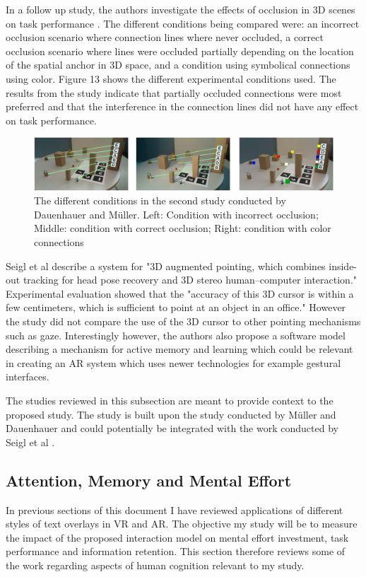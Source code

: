 \documentclass{article}
\begin{document}
In a follow up study, the authors investigate the effects of occlusion in 3D scenes on task performance \cite{Mller7836504}. The different conditions being compared were: an incorrect occlusion scenario where connection lines where never occluded, a correct occlusion scenario where lines were occluded partially depending on the location of the spatial anchor in 3D space, and a condition using symbolical connections using color. Figure 13 shows the different experimental conditions used. The results from the study indicate that partially occluded connections were most preferred and that the interference in the connection lines did not have any effect on task performance.  

\begin{figure}[htbp]
		
        \includegraphics[width=\textwidth]{Images/occludedLink.jpg}
    	\caption{The different conditions in the second study conducted by Dauenhauer and Müller. Left: Condition with incorrect occlusion; Middle: condition with correct occlusion; Right: condition
with color connections \cite{Mller7836504}
}
\end{figure}

Seigl et al \cite{Siegl20071895} describe a system for "3D augmented pointing, which combines inside-out tracking for head pose recovery and 3D stereo human–computer interaction."  Experimental evaluation showed that the "accuracy of this 3D cursor is within a few centimeters, which is sufficient to point at an object in an office." However the study did not compare the use of the 3D cursor to other pointing mechanisms such as gaze.  Interestingly however, the authors also propose a software model describing a mechanism for active memory and learning which could be relevant in creating an AR system which uses newer technologies for example gestural interfaces. 

The studies reviewed in this subsection are meant to provide context to the proposed study. The study is built upon the study conducted by Müller and Dauenhauer \cite{Mller2016} and could potentially be integrated with the work conducted by Seigl et al \cite{Siegl20071895}. 

\subsection{Attention, Memory and Mental Effort}
In previous sections of this document I have reviewed applications of different styles of text overlays in VR and AR. The objective my study will be to measure the impact of the proposed interaction model on mental effort investment, task performance and information retention. This section therefore reviews some of the work regarding aspects of human cognition relevant to my study. 
\end{document}
